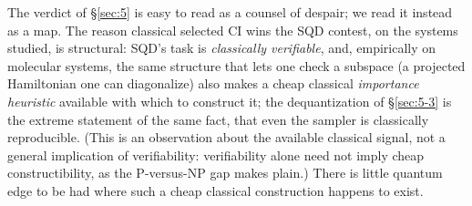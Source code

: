\documentclass[11pt]{article}
\begin{document}
The verdict of \S\ref{sec:5} is easy to read as a counsel of despair; we read it instead as a map. The reason classical selected CI wins the SQD contest, on the systems studied, is structural: SQD's task is \emph{classically verifiable}, and, empirically on molecular systems, the same structure that lets one check a subspace (a projected Hamiltonian one can diagonalize) also makes a cheap classical \emph{importance heuristic} available with which to construct it; the dequantization of \S\ref{sec:5-3} is the extreme statement of the same fact, that even the sampler is classically reproducible. (This is an observation about the available classical signal, not a general implication of verifiability: verifiability alone need not imply cheap constructibility, as the P-versus-NP gap makes plain.) There is little quantum edge to be had where such a cheap classical construction happens to exist.
\end{document}
